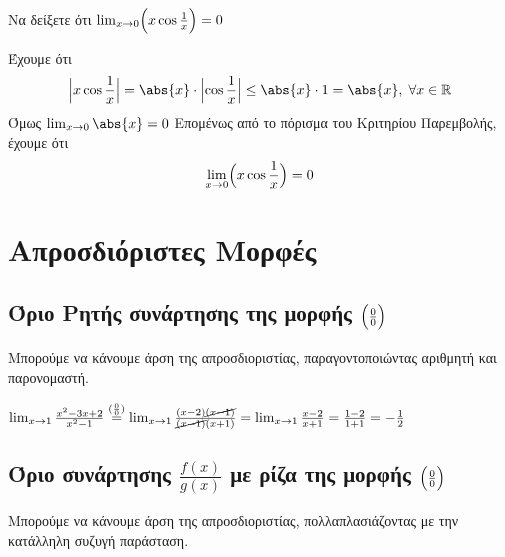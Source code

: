 \begin{example}
  Να δείξετε ότι $ \lim_{x \to 0} \Bigl(x \cos{\frac{1}{x}}\Bigr) = 0 $
\end{example}
\begin{solution}
  Έχουμε ότι
  \[
    \Bigl|x \cos{\frac{1}{x}}\Bigr| = \abs{x} \cdot 
    \Bigl|\cos{\frac{1}{x}}\Bigr| \leq \abs{x} \cdot 1 = 
    \abs{x}, \; \forall x \in \mathbb{R}
  \] 
  Όμως $ \lim_{x \to 0} \abs{x} = 0 $
  Επομένως από το πόρισμα του Κριτηρίου Παρεμβολής, έχουμε ότι 
  \[
    \lim_{x \to 0} \Bigl(x \cos{\frac{1}{x}}\Bigr) = 0 
  \] 
\end{solution}


\section*{Απροσδιόριστες Μορφές}


\subsection*{Όριο Ρητής συνάρτησης της μορφής $\Bigl(\frac{0}{0}\Bigr) $}

Μπορούμε να κάνουμε άρση της απροσδιοριστίας, παραγοντοποιώντας αριθμητή και παρονομαστή.

\begin{example}
  $ \lim_{x \to 1} \frac{x^{2}-3x+2}{x^{2}-1} \overset{(\frac{0}{0})}{=} \lim_{x \to 1}
  \frac{(x-2)\cancel{(x-1)}}{\cancel{(x-1)}(x+1)} = \lim_{x \to 1} \frac{x-2}{x+1} = 
  \frac{1-2}{1+1} = - \frac{1}{2} $
\end{example}


\subsection*{Όριο συνάρτησης $ \frac{f(x)}{g(x)} $ με ρίζα της μορφής $\Bigl(\frac{0}{0}\Bigr)$}

Μπορούμε να κάνουμε άρση της απροσδιοριστίας, πολλαπλασιάζοντας με την κατάλληλη 
συζυγή παράσταση.

